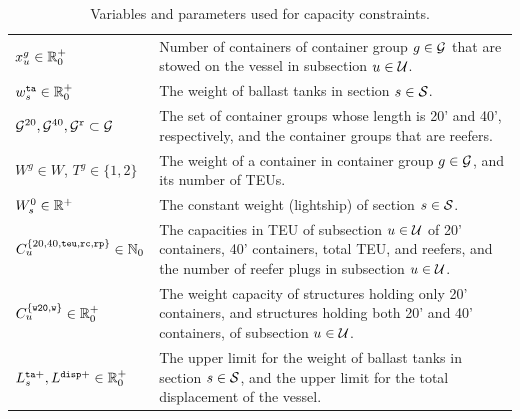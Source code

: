 \begin{table}
\centering
\btsize
\begin{tabular}{lp{10cm}}
$x^g_u\in\mathbb{R}^+_0$						& Number of containers of container group $g\in \mathcal{G}$ that are stowed on the vessel in subsection $u\in \mathcal{U}$.\\
$w^{\texttt{ta}}_s\in\mathbb{R}^+_0$		& The weight of ballast tanks in section $s\in\mathcal{S}$.\\
\hline
$\mathcal{G}^{20}, \mathcal{G}^{40}, \mathcal{G}^\texttt{r}\subset \mathcal{G}$ 
																& The set of container groups whose length is 20' and 40', respectively, and the container groups that are reefers.\\
$W^g\in {W}$, $T^g\in\{1,2\}$		& The weight of a container in container group $g\in \mathcal{G}$, and its number of TEUs.\\
$W^0_{s}\in\mathbb{R}^+$						& The constant weight (lightship) of section $s\in\mathcal{S}$.\\
$C^{\{{20},{40},\texttt{teu}, \texttt{rc}, \texttt{rp}\}}_u\in \mathbb{N}_0$  											
																& The capacities in TEU of subsection $u\in\mathcal{U}$ of 20' containers, 40' containers, total TEU, and reefers, and the number of reefer plugs in subsection $u\in \mathcal{U}$.\\
$C^{\{\texttt{w20}, \texttt{w}\}}_u\in\mathbb{R}^+_0$
																& The weight capacity of structures holding only 20' containers, and structures holding both 20' and 40' containers, of subsection $u\in\mathcal{U}$.\\
$L^{\texttt{ta}+}_s, L^{\texttt{disp}+}\in\mathbb{R}^+_0$
																& The upper limit for the weight of ballast tanks in section $s\in\mathcal{S}$, and the upper limit for the total displacement of the vessel.\\
\end{tabular}
\etsize
\caption{Variables and parameters used for capacity constraints.}\label{tab:capParams}
\end{table}

